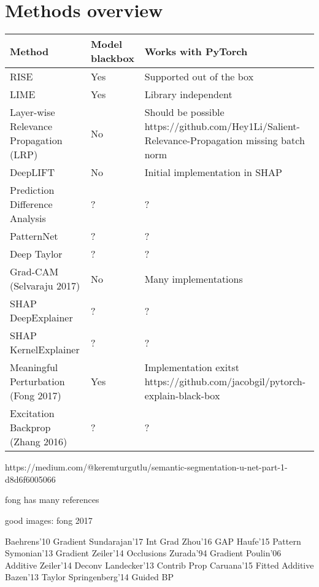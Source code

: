 \section{Methods overview}

\begin{tabular}{| p{7cm} | p{2.5cm} | p{6cm} | }
\hline
\textbf{Method} & \textbf{Model blackbox} & \textbf{Works with PyTorch} \\ \hline
RISE\cite{Petsiuk2018rise} & Yes & Supported out of the box \\ \hline
LIME\cite{ribeiro2016should} & Yes & Library independent \\ \hline
Layer-wise Relevance Propagation (LRP) & No & Should be possible  https://github.com/Hey1Li/Salient-Relevance-Propagation missing batch norm \\ \hline
DeepLIFT & No & Initial implementation in SHAP\cite{NIPS2017_7062} \\ \hline
Prediction Difference Analysis \cite{todo} & ? & ? \\ \hline
PatternNet & ? & ? \\ \hline
Deep Taylor & ? & ? \\ \hline
Grad-CAM (Selvaraju 2017) & No & Many implementations \\ \hline
SHAP DeepExplainer\cite{NIPS2017_7062} & ? & ? \\ \hline
SHAP KernelExplainer\cite{NIPS2017_7062} & ? & ? \\ \hline
Meaningful Perturbation (Fong 2017)\cite{todo} & Yes & Implementation exitst \cite{todo} https://github.com/jacobgil/pytorch-explain-black-box \\ \hline
Excitation Backprop (Zhang 2016)\cite{todo}  & ? & ? \\ \hline
\end{tabular}



https://medium.com/@keremturgutlu/semantic-segmentation-u-net-part-1-d8d6f6005066


fong has many references

good images: fong 2017

Baehrens'10 Gradient
Sundarajan'17 Int Grad
Zhou'16 GAP
Haufe'15 Pattern
Symonian'13 Gradient
Zeiler'14 Occlusions
Zurada'94 Gradient
Poulin'06 Additive
Zeiler'14 Deconv
Landecker'13 Contrib Prop
Caruana'15 Fitted Additive
Bazen'13 Taylor
Springenberg'14 Guided BP


